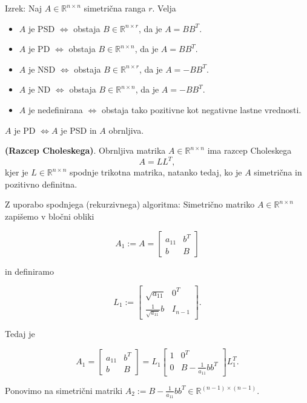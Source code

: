 \documentclass{article}
\begin{document}
\begin{multicols}{2}
Izrek: Naj \( A \in \mathbb{R}^{n \times n} \) simetrična ranga \( r \). Velja
\begin{itemize}
    \item \( A \) je PSD \( \Leftrightarrow \) obstaja \( B \in \mathbb{R}^{n \times r} \), da je \( A = BB^T \).
    \item \( A \) je PD \( \Leftrightarrow \) obstaja \( B \in \mathbb{R}^{n \times n} \), da je \( A = BB^T \).
    \item \( A \) je NSD \( \Leftrightarrow \) obstaja \( B \in \mathbb{R}^{n \times r} \), da je \( A = -BB^T \).
    \item \( A \) je ND \( \Leftrightarrow \) obstaja \( B \in \mathbb{R}^{n \times n} \), da je \( A = -BB^T \).
    \item \( A \) je nedefinirana \( \Leftrightarrow \) obstaja tako pozitivne kot negativne lastne vrednosti.
\end{itemize}
\( A \) je PD \( \Leftrightarrow A \) je PSD in \( A \) obrnljiva.

\textbf{(Razcep Choleskega)}. Obrnljiva matrika \( A \in \mathbb{R}^{n \times n} \) ima razcep Choleskega
\[ A = LL^T, \]
kjer je \( L \in \mathbb{R}^{n \times n} \) spodnje trikotna matrika, natanko tedaj, ko je \( A \) simetrična in pozitivno definitna.

Z uporabo spodnjega (rekurzivnega) algoritma:
Simetrično matriko \( A \in \mathbb{R}^{n \times n} \) zapišemo v bločni obliki

\[
A_1 := A = \begin{bmatrix}
a_{11} & b^T \\
b & B
\end{bmatrix}
\]

in definiramo

\[
L_1 := \begin{bmatrix}
\sqrt{a_{11}} & 0^T \\
\frac{1}{\sqrt{a_{11}}} b & I_{n-1}
\end{bmatrix}.
\]

Tedaj je

\[
A_1 = \begin{bmatrix}
a_{11} & b^T \\
b & B
\end{bmatrix} = L_1 \begin{bmatrix}
1 & 0^T \\
0 & B - \frac{1}{a_{11}} bb^T
\end{bmatrix} L_1^T.
\]

Ponovimo na simetrični matriki \( A_2 := B - \frac{1}{a_{11}} bb^T \in \mathbb{R}^{(n-1) \times (n-1)} \).


\end{multicols}
\end{document}
